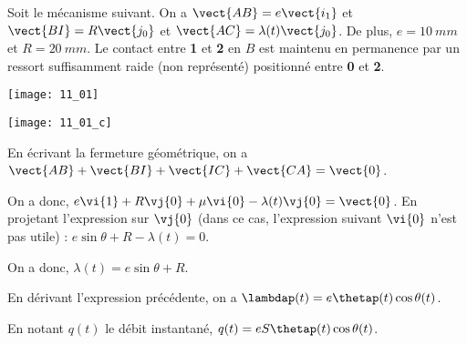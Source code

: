 \normalfalse \difficiletrue \tdifficilefalse
\correctiontrue


\setcounter{question}{0}%
\ifcorrection
\else
{}
\fi

\ifprof
\else
Soit le mécanisme suivant. On a $\vect{AB}=e\vect{i_1}$ et $\vect{BI}=R\vect{j_0}$ et $\vect{AC}=\lambda(t)\vect{j_0}$. De plus, 
$e=\SI{10}{mm}$ et $R=\SI{20}{mm}$. Le contact entre \textbf{1} et \textbf{2} en $B$ est maintenu en permanence par un ressort suffisamment raide (non représenté) positionné entre \textbf{0} et \textbf{2}. 
\begin{marginfigure}
\texttt{[image: 11\_01]}
\end{marginfigure}
\fi


\ifprof
\begin{marginfigure}
\texttt{[image: 11\_01\_c]}
\end{marginfigure}

\else
\fi


\ifprof

En écrivant la fermeture géométrique, on a $\vect{AB}+\vect{BI}+\vect{IC}+\vect{CA}=\vect{0}$.

On a donc, $e\vi{1}+R\vj{0}+\mu\vi{0}-\lambda(t)\vj{0}=\vect{0}$. En projetant l'expression sur $\vj{0}$ (dans ce cas, l'expression suivant $\vi{0}$ n'est pas utile) :
$ e\sin\theta +R - \lambda(t)=0$.

On a donc, $\lambda(t)=e\sin\theta +R $.
\else
\fi

\ifprof

En dérivant l'expression précédente, on a $\lambdap (t)=e\thetap(t) \cos\theta (t) $.
\else
\fi

\ifprof

En notant $q(t)$ le débit instantané, $q(t)=eS\thetap(t) \cos\theta (t)$.
\else
\fi

